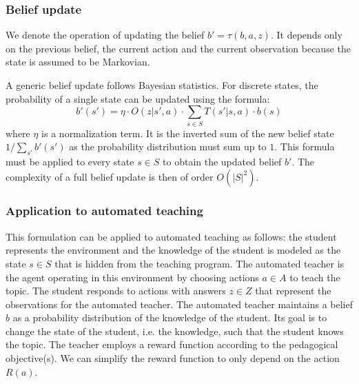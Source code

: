 \subsubsection{Belief update}

We denote the operation of updating the belief $b'=\tau(b,a,z)$.
It depends only on the previous belief, the current action and the current observation because the state is assumed to be Markovian.

A generic belief update follows Bayesian statistics.
For discrete states, the probability of a single state can be updated using the formula:
\begin{equation}
    b'(s') = \eta \cdot O(z|s',a) \cdot \sum_{s \in S} T(s'|s,a) \cdot b(s)
    \label{eq:belief}
\end{equation}
where $\eta$ is a normalization term.
It is the inverted sum of the new belief state $1 / \sum_{s'} b'(s')$ as the probability distribution must sum up to $1$. 
This formula must be applied to every state $s \in S$ to obtain the updated belief $b'$.
The complexity of a full belief update is then of order $O(|S|^2)$.

\subsubsection{Application to automated teaching}

This formulation can be applied to automated teaching as follows: the student represents the environment and the knowledge of the student is modeled as the state $s \in S$ that is hidden from the teaching program.
The automated teacher is the agent operating in this environment by choosing actions $a \in A$ to teach the topic.
The student responds to actions with answers $z \in Z$ that represent the observations for the automated teacher.
The automated teacher maintains a belief $b$ as a probability distribution of the knowledge of the student.
Its goal is to change the state of the student, i.e. the knowledge, such that the student knows the topic.
The teacher employs a reward function according to the pedagogical objective(s).
We can simplify the reward function to only depend on the action $R(a)$.

